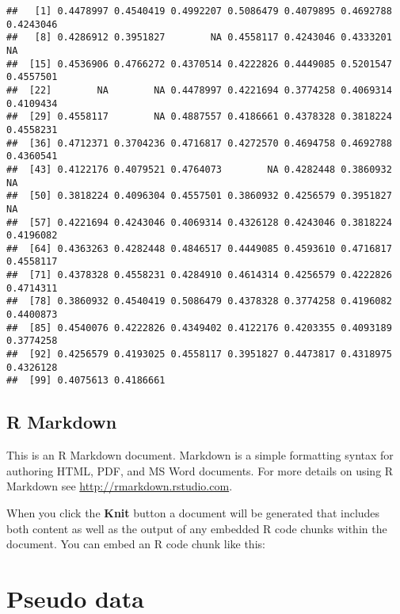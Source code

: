 \documentclass[
]{article}
\begin{document}
\begin{verbatim}
##   [1] 0.4478997 0.4540419 0.4992207 0.5086479 0.4079895 0.4692788 0.4243046
##   [8] 0.4286912 0.3951827        NA 0.4558117 0.4243046 0.4333201        NA
##  [15] 0.4536906 0.4766272 0.4370514 0.4222826 0.4449085 0.5201547 0.4557501
##  [22]        NA        NA 0.4478997 0.4221694 0.3774258 0.4069314 0.4109434
##  [29] 0.4558117        NA 0.4887557 0.4186661 0.4378328 0.3818224 0.4558231
##  [36] 0.4712371 0.3704236 0.4716817 0.4272570 0.4694758 0.4692788 0.4360541
##  [43] 0.4122176 0.4079521 0.4764073        NA 0.4282448 0.3860932        NA
##  [50] 0.3818224 0.4096304 0.4557501 0.3860932 0.4256579 0.3951827        NA
##  [57] 0.4221694 0.4243046 0.4069314 0.4326128 0.4243046 0.3818224 0.4196082
##  [64] 0.4363263 0.4282448 0.4846517 0.4449085 0.4593610 0.4716817 0.4558117
##  [71] 0.4378328 0.4558231 0.4284910 0.4614314 0.4256579 0.4222826 0.4714311
##  [78] 0.3860932 0.4540419 0.5086479 0.4378328 0.3774258 0.4196082 0.4400873
##  [85] 0.4540076 0.4222826 0.4349402 0.4122176 0.4203355 0.4093189 0.3774258
##  [92] 0.4256579 0.4193025 0.4558117 0.3951827 0.4473817 0.4318975 0.4326128
##  [99] 0.4075613 0.4186661
\end{verbatim}

\hypertarget{r-markdown}{%
\subsection{R Markdown}\label{r-markdown}}

This is an R Markdown document. Markdown is a simple formatting syntax
for authoring HTML, PDF, and MS Word documents. For more details on
using R Markdown see \url{http://rmarkdown.rstudio.com}.

When you click the \textbf{Knit} button a document will be generated
that includes both content as well as the output of any embedded R code
chunks within the document. You can embed an R code chunk like this:

\hypertarget{pseudo-data}{%
\section{Pseudo data}\label{pseudo-data}}
\end{document}
